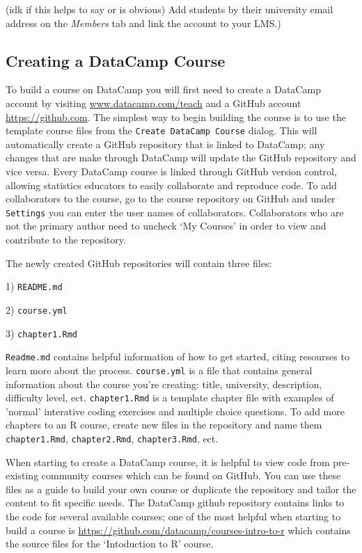 \documentclass[12pt]{article}
\begin{document}
(idk if this helps to say or is obvious) Add students by their university email address on the \textit{Members} tab and link the account to your LMS.)



\subsection{Creating a DataCamp Course}
To build a course on DataCamp you will first need to create a DataCamp account by visiting \url{www.datacamp.com/teach} and
a GitHub account \url{https://github.com}. The simplest way to begin building the course is to use the template course files from the 
\texttt{Create DataCamp Course} dialog. This will automatically create a GitHub repository that is linked to DataCamp; any changes that are
make through DataCamp will update the GitHub repository and vice versa. Every DataCamp course is linked through GitHub version control,
allowing statistics educators to easily collaborate and reproduce code. To add collaborators to the course, go to the course repository
on GitHub and under \texttt{Settings} you can enter the user names of collaborators. Collaborators who are not the primary author need 
to uncheck `My Courses' in order to view and contribute to the repository.



The newly created GitHub repositories will contain three files: 

1) \texttt{README.md}

2) \texttt{course.yml}

3) \texttt{chapter1.Rmd}


\texttt{Readme.md} contains helpful information of how to get started, citing resourses to learn more about the process.
\texttt{course.yml} is a file that contains general information about the course you're creating: title, university, description,
difficulty level, ect.
\texttt{chapter1.Rmd} is a template chapter file with examples of 'normal' interative coding exercises and multiple choice questions.
To add more chapters to an R course, create new files in the repository and name them \texttt{chapter1.Rmd}, \texttt{chapter2.Rmd},
\texttt{chapter3.Rmd}, ect.

When starting to create a DataCamp course, it is helpful to view code from pre-existing community courses which can be found on GitHub.
You can use these files as a guide to build your own course or duplicate the repository and tailor the content to fit specific needs.
The DataCamp github repository contains links to the code for several available courses; one of the most helpful when starting to build a course 
is \url{https://github.com/datacamp/courses-intro-to-r} which contains the source files for the `Intoduction to R' course.
\end{document}
